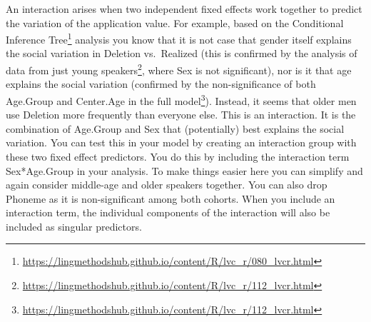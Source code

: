 \documentclass[
  10pt,
  letterpaper]{article}
\renewcommand\texttt[1]{{\ttfamily\color{BrickRed}#1}}
\DeclareRobustCommand{\href}[2]{#2\footnote{\url{#1}}}
\begin{document}
An interaction arises when two independent fixed effects work together
to predict the variation of the application value. For example, based on
the
\href{https://lingmethodshub.github.io/content/R/lvc_r/080_lvcr.html}{Conditional
Inference Tree} analysis you know that it is not case that gender itself
explains the social variation in \texttt{Deletion} vs.~\texttt{Realized}
(this is confirmed by the
\href{https://lingmethodshub.github.io/content/R/lvc_r/112_lvcr.html}{analysis
of data from just young speakers}, where \texttt{Sex} is not
significant), nor is it that age explains the social variation
(confirmed by the non-significance of both \texttt{Age.Group} and
\texttt{Center.Age} in
\href{https://lingmethodshub.github.io/content/R/lvc_r/112_lvcr.html}{the
full model}). Instead, it seems that older men use \texttt{Deletion}
more frequently than everyone else. This is an interaction. It is the
combination of \texttt{Age.Group} and \texttt{Sex} that (potentially)
best explains the social variation. You can test this in your model by
creating an interaction group with these two fixed effect predictors.
You do this by including the interaction term \texttt{Sex*Age.Group} in
your analysis. To make things easier here you can simplify and again
consider middle-age and older speakers together. You can also drop
\texttt{Phoneme} as it is non-significant among both cohorts. When you
include an interaction term, the individual components of the
interaction will also be included as singular predictors.
\end{document}
